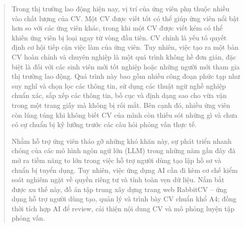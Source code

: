 \documentclass[12pt,a4paper,oneside]{book}
\begin{document}
\begin{abstract}

  Trong thị trường lao động hiện nay, vị trí của ứng viên phụ thuộc nhiều vào chất lượng của CV. Một CV được viết tốt có thể giúp ứng viên nổi bật hơn so với các ứng viên khác, trong khi một CV được viết kém có thể khiến ứng viên bị loại ngay từ vòng đầu tiên. CV chính là yếu tố quyết định cơ hội tiếp cận việc làm của ứng viên. Tuy nhiên, việc tạo ra một bản CV hoàn chỉnh và chuyên nghiệp là một quá trình không hề đơn giản, đặc biệt là đối với các sinh viên mới tốt nghiệp hoặc những người mới tham gia thị trường lao động. Quá trình này bao gồm nhiều công đoạn phức tạp như suy nghĩ và chọn lọc các thông tin, sử dụng các thuật ngữ nghề nghiệp chuẩn xác, sắp xếp các thông tin, bố cục và định dạng sao cho vừa vặn trong một trang giấy mà không bị rối mắt. Bên cạnh đó, nhiều ứng viên còn lúng túng khi không biết CV của mình còn thiếu sót những gì và chưa có sự chuẩn bị kỹ lưỡng trước các câu hỏi phỏng vấn thực tế.
  
  Nhằm hỗ trợ ứng viên tháo gỡ những khó khăn này, sự phát triển nhanh chóng của các mô hình ngôn ngữ lớn (LLM) trong những năm gần đây đã mở ra tiềm năng to lớn trong việc hỗ trợ người dùng tạo lập hồ sơ và chuẩn bị tuyển dụng. Tuy nhiên, việc ứng dụng AI cần đi kèm cơ chế kiểm soát nghiêm ngặt về quyền riêng tư và tính toàn vẹn dữ liệu. Nắm bắt được xu thế này, đồ án tập trung xây dựng trang web RabbitCV -- ứng dụng hỗ trợ người dùng tạo, quản lý và trình bày CV chuẩn khổ A4; đồng thời tích hợp AI để review, cải thiện nội dung CV và mô phỏng luyện tập phỏng vấn.


\end{abstract}
\end{document}
